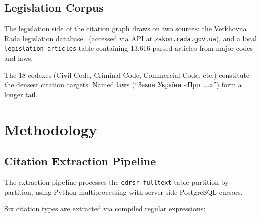 \documentclass[11pt]{article}
\begin{document}
\subsection{Legislation Corpus}

The legislation side of the citation graph draws on two sources: the Verkhovna Rada legislation database~\citep{zakonrada} (accessed via API at \texttt{zakon.rada.gov.ua}), and a local \texttt{legislation\_articles} table containing 13{,}616 parsed articles from major codes and laws.

The 18 codexes (Civil Code, Criminal Code, Commercial Code, etc.) constitute the densest citation targets.
Named laws (``Закон України «Про~...»'') form a longer tail.


\section{Methodology}
\label{sec:method}

\subsection{Citation Extraction Pipeline}
\label{sec:extraction}

The extraction pipeline processes the \texttt{edrsr\_fulltext} table partition by partition, using Python multiprocessing with server-side PostgreSQL cursors.

Six citation types are extracted via compiled regular expressions:
\end{document}
